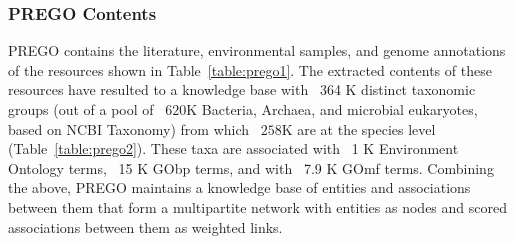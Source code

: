 {   \subsubsection*{PREGO Contents}
   \label{subsec:prego-contents}

   PREGO contains the literature, environmental samples, and genome annotations of the resources shown in Table~\ref{table:prego1}. 
   The extracted contents of these resources have resulted to a knowledge base with ~364 K distinct taxonomic groups (out of a pool of ~$620$K Bacteria, Archaea, and microbial eukaryotes, based on NCBI Taxonomy) from which ~$258$K are at the species level (Table~\ref{table:prego2}). 
   These taxa are associated with ~1 K Environment Ontology terms, ~15 K GObp terms, and with ~7.9 K GOmf terms. 
   Combining the above, PREGO maintains a knowledge base of entities and associations between them that form a multipartite network with entities as nodes and scored associations between them as weighted links.


}
